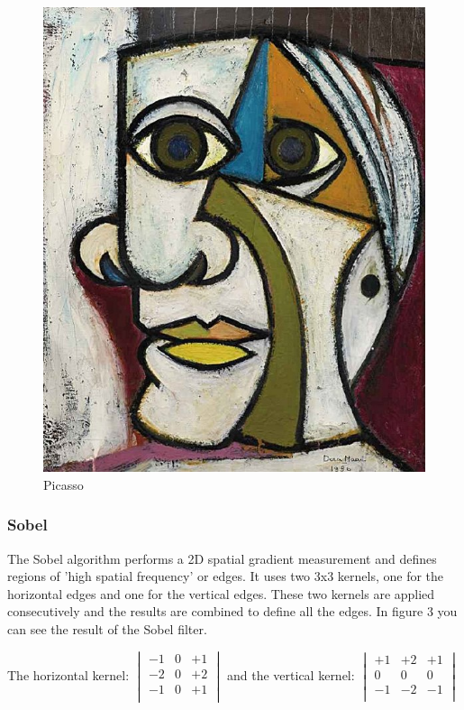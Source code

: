 \documentclass[12pt]{article}
\begin{document}
\begin{figure}[h]
\centering
\includegraphics[scale = 0.39]{img/picasso}
\caption{Picasso}
\end{figure}

\subsubsection{Sobel}

 The Sobel algorithm performs a 2D spatial gradient measurement and defines regions of 'high spatial frequency' or edges. It uses two 3x3 kernels, one for the horizontal edges and one for the vertical edges. These two kernels are applied consecutively and the results are combined to define all the edges. In figure 3 you can see the result of the Sobel filter.
 \newline

 The horizontal kernel: 
 $\begin{vmatrix}
        -1 & 0 & +1\\
        -2 & 0 & +2\\
        -1 & 0 & +1\\
\end{vmatrix}$
and the vertical kernel:
$\begin{vmatrix}
        +1 & +2 & +1\\
        0 & 0 & 0\\
        -1 & -2 & -1\\
\end{vmatrix}$
\end{document}
